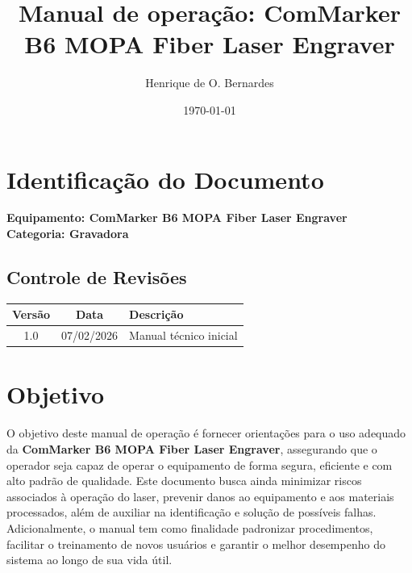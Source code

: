 \documentclass[11pt]{article}
\title{Manual de operação: ComMarker B6 MOPA Fiber Laser Engraver}
\author{Henrique de O. Bernardes}
\affil{}
\date{\today}
\begin{document}
\maketitle
\thispagestyle{fancy}


\section{Identificação do Documento}
\textbf{Equipamento: ComMarker B6 MOPA Fiber Laser Engraver}\\
\textbf{Categoria: Gravadora}\\

\subsection{Controle de Revisões}
\begin{center}
\begin{tabular}{|c|c|p{8cm}|}
\hline
\textbf{Versão} & \textbf{Data} & \textbf{Descrição} \\
\hline
1.0 & 07/02/2026 & Manual técnico inicial \\
\hline
\end{tabular}
\end{center}


\section{Objetivo}
O objetivo deste manual de operação é fornecer orientações para o uso adequado da \textbf{ComMarker B6 MOPA Fiber Laser Engraver}, assegurando que o operador seja capaz de operar o equipamento de forma segura, eficiente e com alto padrão de qualidade. Este documento busca ainda minimizar riscos associados à operação do laser, prevenir danos ao equipamento e aos materiais processados, além de auxiliar na identificação e solução de possíveis falhas. Adicionalmente, o manual tem como finalidade padronizar procedimentos, facilitar o treinamento de novos usuários e garantir o melhor desempenho do sistema ao longo de sua vida útil.
\end{document}
